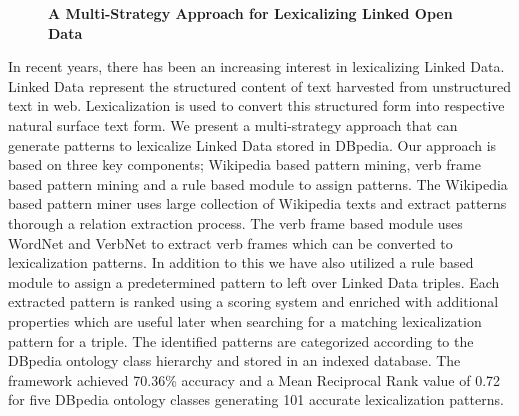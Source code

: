 \documentclass[10pt, a4paper, twopage, headinclude, footinclude, BCOR5mm]{book}
\begin{document}
\newpage

\begin{figure}[t!]
\centering
\large\textbf{A Multi-Strategy Approach for Lexicalizing Linked Open Data}
\vspace*{0.5cm}
\end{figure}


\begin{table}[t!]
\end{table} 
\noindent
In recent years, there has been an increasing interest in lexicalizing Linked Data. Linked Data represent the structured content of text harvested from unstructured text in web. Lexicalization is used to convert this structured form into respective natural surface text form. We present a multi-strategy approach that can generate patterns to lexicalize Linked Data stored in DBpedia. Our approach is based on three key components; Wikipedia based pattern mining, verb frame based pattern mining and a rule based module to assign patterns. The Wikipedia based pattern miner uses large collection of Wikipedia texts and extract patterns thorough a relation extraction process. The verb frame based module uses WordNet and VerbNet to extract verb frames which can be converted to lexicalization patterns. In addition to this we have also utilized a rule based module to assign a predetermined pattern to left over Linked Data triples.  Each extracted pattern is ranked using a scoring system and enriched with additional properties which are useful later when searching for a matching lexicalization pattern for a triple. The identified patterns are categorized according to the DBpedia ontology class hierarchy and stored in an indexed database. The framework achieved 70.36\% accuracy and a Mean Reciprocal Rank value of 0.72 for five DBpedia ontology classes generating 101 accurate lexicalization patterns.  
\end{document}
